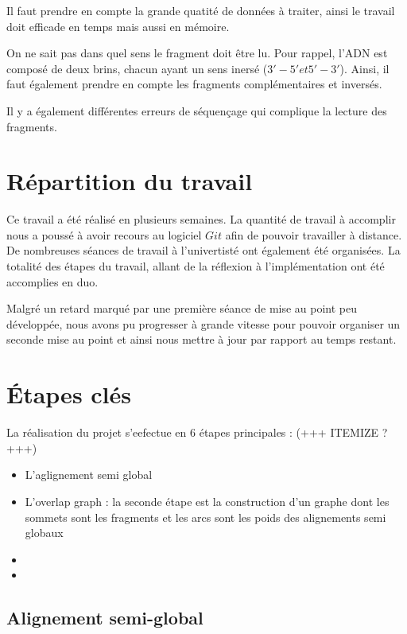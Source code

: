\documentclass{article}
\begin{document}
Il faut prendre en compte la grande quatité de données à traiter, ainsi le travail doit efficade en temps mais aussi en mémoire.

On ne sait pas dans quel sens le fragment doit être lu. Pour rappel, l'ADN est composé de deux brins, chacun ayant un sens inersé ($ 3' - 5' et 5' -3'$). Ainsi, il faut également prendre en compte les fragments complémentaires et inversés.

Il y a également différentes erreurs de séquençage qui complique la lecture des fragments.

\section{Répartition du travail}


Ce travail a été réalisé en plusieurs semaines. La quantité de travail à accomplir nous a poussé à avoir recours au logiciel $Git$ afin de pouvoir travailler à distance. De nombreuses séances de travail à l'univertisté ont également été organisées. La totalité des étapes du travail, allant de la réflexion à l'implémentation ont été accomplies en duo.

Malgré un retard marqué par une première séance de mise au point peu développée, nous avons pu progresser à grande vitesse pour pouvoir organiser un seconde mise au point et ainsi nous mettre à jour par rapport au temps restant.

\newpage

\section{\'Etapes clés}

La réalisation du projet s'eefectue en 6 étapes principales : (+++ ITEMIZE ?+++)

\begin{itemize}
\item L'aglignement semi global
\item L'overlap graph : la seconde étape est la construction d'un graphe dont les sommets sont les fragments et les arcs sont les poids des alignements semi globaux
\item 
\item 
\end{itemize}


\subsection{Alignement semi-global}
\end{document}
